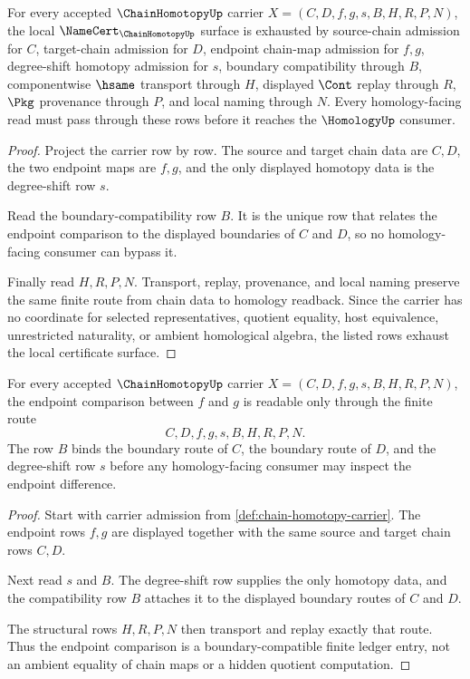 \begin{theorem}
\label{thm:chain-homotopy-namecert-obligations}
For every accepted $\ChainHomotopyUp$ carrier $X=(C,D,f,g,s,B,H,R,P,N)$, the local $\NameCert_{\ChainHomotopyUp}$ surface is exhausted by source-chain admission for $C$, target-chain admission for $D$, endpoint chain-map admission for $f,g$, degree-shift homotopy admission for $s$, boundary compatibility through $B$, componentwise $\hsame$ transport through $H$, displayed $\Cont$ replay through $R$, $\Pkg$ provenance through $P$, and local naming through $N$. Every homology-facing read must pass through these rows before it reaches the $\HomologyUp$ consumer.
\end{theorem}
\begin{proof}
Project the carrier row by row. The source and target chain data are $C,D$, the two endpoint maps are $f,g$, and the only displayed homotopy data is the degree-shift row $s$.

Read the boundary-compatibility row $B$. It is the unique row that relates the endpoint comparison to the displayed boundaries of $C$ and $D$, so no homology-facing consumer can bypass it.

Finally read $H,R,P,N$. Transport, replay, provenance, and local naming preserve the same finite route from chain data to homology readback. Since the carrier has no coordinate for selected representatives, quotient equality, host equivalence, unrestricted naturality, or ambient homological algebra, the listed rows exhaust the local certificate surface.
\end{proof}

\begin{theorem}
\label{thm:chain-homotopy-boundary-compatibility}
For every accepted $\ChainHomotopyUp$ carrier $X=(C,D,f,g,s,B,H,R,P,N)$, the endpoint comparison between $f$ and $g$ is readable only through the finite route
$$
C,D,f,g,s,B,H,R,P,N.
$$
The row $B$ binds the boundary route of $C$, the boundary route of $D$, and the degree-shift row $s$ before any homology-facing consumer may inspect the endpoint difference.
\end{theorem}
\begin{proof}
Start with carrier admission from \autoref{def:chain-homotopy-carrier}. The endpoint rows $f,g$ are displayed together with the same source and target chain rows $C,D$.

Next read $s$ and $B$. The degree-shift row supplies the only homotopy data, and the compatibility row $B$ attaches it to the displayed boundary routes of $C$ and $D$.

The structural rows $H,R,P,N$ then transport and replay exactly that route. Thus the endpoint comparison is a boundary-compatible finite ledger entry, not an ambient equality of chain maps or a hidden quotient computation.
\end{proof}

